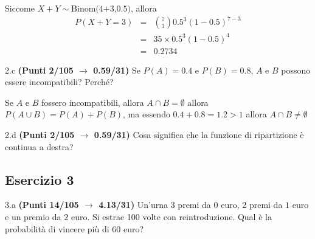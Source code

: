 \documentclass[
  11pt,
]{book}
\theoremstyle{mytheoremstyle}
\theoremstyle{mydefstyle}
\newenvironment{sol}
  {
  \begin{tcolorbox}[enhanced,breakable,arc=0.1mm,boxrule=1pt,colback=white,colframe=iblue,
  title=\bf \fontfamily{lmss}\selectfont \hspace{.5 cm} Soluzione,drop fuzzy shadow]

}{
\end{tcolorbox}
  }
\begin{document}
\begin{sol}
Siccome \(X+Y\sim\text{Binom(4+3,0.5)}\), allora
\normalsize 
\begin{eqnarray*}
      P( X+Y = 3 ) &=& \binom{ 7 }{ 3 } 0.5 ^{ 3 }(1- 0.5 )^{ 7 - 3 } \\                 &=& 35 \times 0.5 ^{ 3 }(1- 0.5 )^{ 4 } \\                 &=& 0.2734 
   \end{eqnarray*}
\normalsize 

\end{sol}

2.c \textbf{(Punti 2/105 \(\rightarrow\) 0.59/31)} Se \(P(A)=0.4\) e \(P(B)=0.8\), \(A\) e \(B\) possono essere incompatibili? Perché?

\begin{sol}
Se \(A\) e \(B\) fossero incompatibili, allora \(A\cap B=\emptyset\) allora \(P(A\cup B)=P(A)+P(B)\), ma essendo \(0.4+0.8=1.2>1\) allora \(A\cap B\neq\emptyset\)

\end{sol}

2.d \textbf{(Punti 2/105 \(\rightarrow\) 0.59/31)} Cosa significa che la funzione di ripartizione è continua a destra?

\subsection{Esercizio 3}\label{esercizio-3-34}

3.a \textbf{(Punti 14/105 \(\rightarrow\) 4.13/31)} Un'urna 3 premi da \(\mbox{0}\) euro, 2 premi da \(\mbox{1}\) euro e un premio da \(\mbox{2}\) euro.
Si estrae 100 volte con reintroduzione.
Qual è la probabilità di vincere più di 60 euro?
\end{document}
